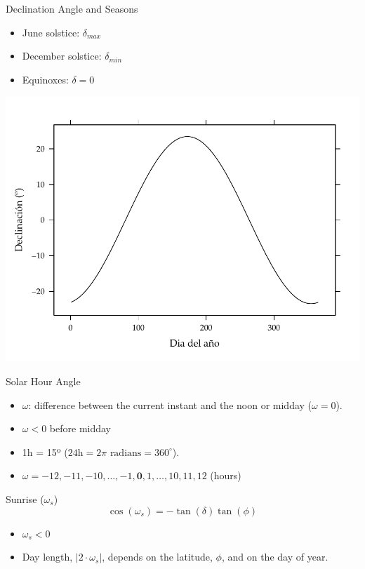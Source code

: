 \documentclass[xcolor={usenames,svgnames,dvipsnames}]{beamer}
\begin{document}
\begin{frame}[label={sec:orgb6a4a75}]{Declination Angle and Seasons}
\begin{itemize}
\item June solstice: \(\delta_{max}\)
\item December solstice: \(\delta_{min}\)
\item Equinoxes: \(\delta = 0\)
\end{itemize}

\begin{center}
\includegraphics[width=.9\linewidth]{../figs/Declinacion.pdf}
\end{center}
\end{frame}

\begin{frame}[label={sec:org715dae0}]{Solar Hour Angle}
\begin{itemize}
\item \(\omega\): difference between the current instant and the noon or midday (\(\omega = 0\)).

\item \(\omega < 0\) before midday
\item 1h = 15º (\(24\text{h} = 2\pi \text{ radians} = 360^\circ\)).
\item \(\boxed{\omega = -12, -11, -10, \dots, -1, \textbf{0}, 1, \dots, 10, 11, 12}\) (hours)
\end{itemize}

\begin{block}{Sunrise (\(\omega_s\))}
\[
\cos(\omega_{s}) = -\tan(\delta)\tan(\phi)
\]
\begin{itemize}
\item \(\omega_s < 0\)
\item Day length, \(|2 \cdot \omega_s|\), depends on the \alert{latitude}, \(\phi\), and on the \alert{day of year}.
\end{itemize}
\end{block}
\end{frame}
\end{document}
